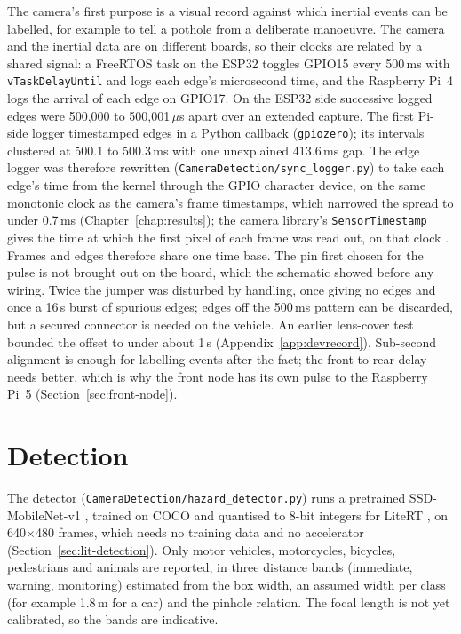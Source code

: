 The camera's first purpose is a visual record against which inertial events can be labelled, for example to tell a pothole from a deliberate manoeuvre. The camera and the inertial data are on different boards, so their clocks are related by a shared signal: a FreeRTOS task on the ESP32 toggles GPIO15 every 500\,ms with \texttt{vTaskDelayUntil} and logs each edge's microsecond time, and the Raspberry Pi~4 logs the arrival of each edge on GPIO17. On the ESP32 side successive logged edges were 500,000 to 500,001\,$\mu$s apart over an extended capture. The first Pi-side logger timestamped edges in a Python callback (\texttt{gpiozero}); its intervals clustered at 500.1 to 500.3\,ms with one unexplained 413.6\,ms gap. The edge logger was therefore rewritten (\texttt{CameraDetection/\allowbreak{}sync\_\allowbreak{}logger.py}) to take each edge's time from the kernel through the GPIO character device, on the same monotonic clock as the camera's frame timestamps, which narrowed the spread to under 0.7\,ms (Chapter~\ref{chap:results}); the camera library's \texttt{SensorTimestamp} gives the time at which the first pixel of each frame was read out, on that clock \cite{picamera2manual}. Frames and edges therefore share one time base. The pin first chosen for the pulse is not brought out on the board, which the schematic showed before any wiring. Twice the jumper was disturbed by handling, once giving no edges and once a 16\,s burst of spurious edges; edges off the 500\,ms pattern can be discarded, but a secured connector is needed on the vehicle. An earlier lens-cover test bounded the offset to under about 1\,s (Appendix~\ref{app:devrecord}). Sub-second alignment is enough for labelling events after the fact; the front-to-rear delay needs better, which is why the front node has its own pulse to the Raspberry Pi~5 (Section~\ref{sec:front-node}).

\section{Detection}
\label{sec:impl-detect}

The detector (\texttt{CameraDetection/\allowbreak{}hazard\_\allowbreak{}detector.py}) runs a pretrained SSD-MobileNet-v1 \cite{liu2016ssd, howard2017mobilenets}, trained on COCO \cite{lin2014coco} and quantised to 8-bit integers \cite{jacob2018quantization} for LiteRT \cite{litert}, on 640$\times$480 frames, which needs no training data and no accelerator (Section~\ref{sec:lit-detection}). Only motor vehicles, motorcycles, bicycles, pedestrians and animals are reported, in three distance bands (immediate, warning, monitoring) estimated from the box width, an assumed width per class (for example 1.8\,m for a car) and the pinhole relation. The focal length is not yet calibrated, so the bands are indicative.


